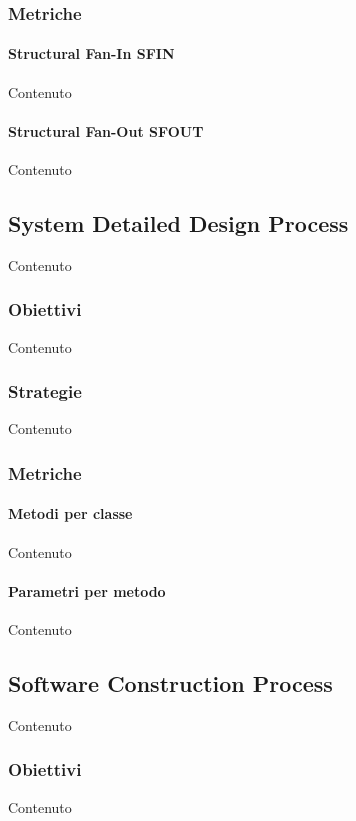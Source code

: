     \subsubsection{Metriche}

    \paragraph{Structural Fan-In SFIN}
    Contenuto

    \paragraph{Structural Fan-Out SFOUT}
    Contenuto


    \subsection{System Detailed Design Process}
    Contenuto

    \subsubsection{Obiettivi}
    Contenuto

    \subsubsection{Strategie}
    Contenuto


    \subsubsection{Metriche}

    \paragraph{Metodi per classe}
    Contenuto

    \paragraph{Parametri per metodo}
    Contenuto


    \subsection{Software Construction Process}
    Contenuto

    \subsubsection{Obiettivi}
    Contenuto

